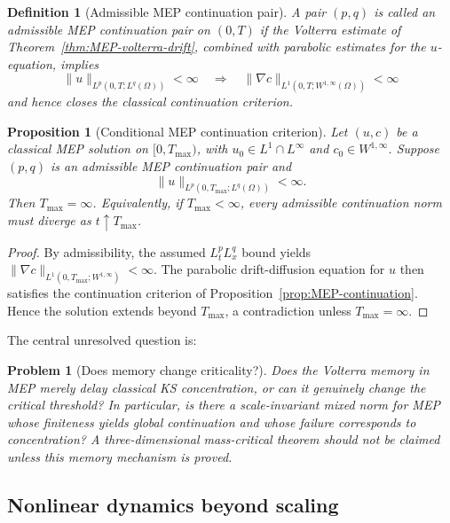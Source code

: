 \documentclass[pdflatex,sn-mathphys-num]{sn-jnl}%
\theoremstyle{thmstyleone}
\newtheorem{proposition}[theorem]{Proposition}%
\theoremstyle{thmstyletwo}
\newtheorem{problem}[theorem]{Problem}
\theoremstyle{thmstylethree}
\newtheorem{definition}{Definition}
\begin{document}
\begin{definition}[Admissible MEP continuation pair]
\label{def:MEP-admissible-pair}
A pair \((p,q)\) is called an admissible MEP continuation pair on \((0,T)\) if the Volterra estimate of Theorem~\ref{thm:MEP-volterra-drift}, combined with parabolic estimates for the \(u\)-equation, implies
\[
        \|u\|_{L^p(0,T;L^q(\Omega))}<\infty
        \quad\Longrightarrow\quad
        \|\nabla c\|_{L^1(0,T;W^{1,\infty}(\Omega))}<\infty
\]
and hence closes the classical continuation criterion.
\end{definition}

\begin{proposition}[Conditional MEP continuation criterion]
\label{prop:MEP-critical-continuation-final}
Let \((u,c)\) be a classical MEP solution on \([0,T_{\max})\), with \(u_0\in L^1\cap L^\infty\) and \(c_0\in W^{1,\infty}\).  Suppose \((p,q)\) is an admissible MEP continuation pair and
\[
        \|u\|_{L^p(0,T_{\max};L^q(\Omega))}<\infty.
\]
Then \(T_{\max}=\infty\).  Equivalently, if \(T_{\max}<\infty\), every admissible continuation norm must diverge as \(t\uparrow T_{\max}\).
\end{proposition}

\begin{proof}
By admissibility, the assumed \(L^p_tL^q_x\) bound yields
\(\|\nabla c\|_{L^1(0,T_{\max};W^{1,\infty})}<\infty\).  The parabolic
drift-diffusion equation for \(u\) then satisfies the continuation criterion
of Proposition~\ref{prop:MEP-continuation}.  Hence the solution extends beyond
\(T_{\max}\), a contradiction unless \(T_{\max}=\infty\).
\end{proof}

The central unresolved question is:

\begin{problem}[Does memory change criticality?]
\label{prob:memory-criticality-final}
Does the Volterra memory in MEP merely delay classical KS
concentration, or can it genuinely change the critical threshold?  In
particular, is there a scale-invariant mixed norm for MEP whose finiteness
yields global continuation and whose failure corresponds to concentration?
A three-dimensional mass-critical theorem should not be claimed unless this
memory mechanism is proved.
\end{problem}

\subsection{Nonlinear dynamics beyond scaling}
\label{subsec:nonlinear-dynamics-beyond-scaling}
\end{document}
